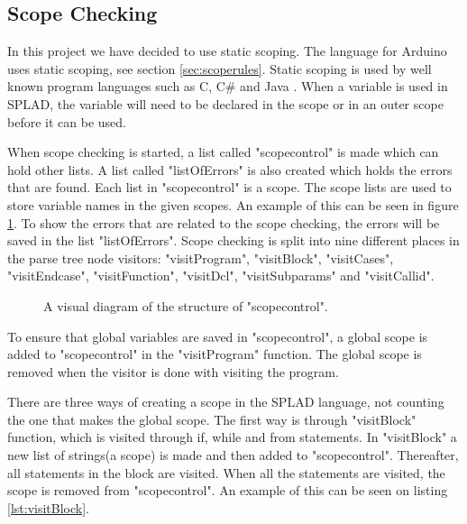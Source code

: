 \subsection{Scope Checking}
\label{sec:scopecheck}
In this project we have decided to use static scoping. The language for Arduino uses static scoping, see section \ref{sec:scoperules}. Static scoping is used by well known program languages such as C, C\# and Java \citep{ProgrammingCommunityIndex}. When a variable is used in SPLAD, the variable will need to be declared in the scope or in an outer scope before it can be used.

When scope checking is started, a list called "scopecontrol" is made which can hold other lists. A list called "listOfErrors" is also created which holds the errors that are found. Each list in "scopecontrol" is a scope. The scope lists are used to store variable names in the given scopes. An example of this can be seen in figure \ref{fig:scopediagram}. To show the errors that are related to the scope checking, the errors will be saved in the list "listOfErrors". Scope checking is split into nine different places in the parse tree node visitors: "visitProgram", "visitBlock", "visitCases", "visitEndcase", "visitFunction", "visitDcl", "visitSubparams" and "visitCallid".

\begin{figure}[H]

\centering
{}
\caption{A visual diagram of the structure of "scopecontrol".}
\label{fig:scopediagram}
\end{figure}

To ensure that global variables are saved in "scopecontrol", a global scope is added to "scopecontrol" in the "visitProgram" function. The global scope is removed when the visitor is done with visiting the program.

There are three ways of creating a scope in the SPLAD language, not counting the one that makes the global scope. The first way is through "visitBlock" function, which is visited through if, while and from statements. In "visitBlock" a new list of strings(a scope) is made and then added to "scopecontrol". Thereafter, all statements in the block are visited. When all the statements are visited, the scope is removed from "scopecontrol". An example of this can be seen on listing \ref{lst:visitBlock}.

